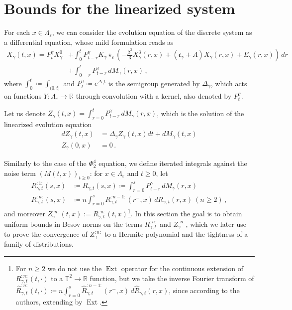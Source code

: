 \documentclass{report}
\newcommand{\RR}{\mathbb{R}}
\newcommand{\TT}{\mathbb{T}}
\newcommand{\Convolve}[3][]{#2 \star_{#1} #3}
\DeclareMathOperator{\DefiningEquality}{\coloneqq}
\DeclareMathOperator{\Ext}{Ext}
\theoremstyle{remark}
\theoremstyle{definition}
\let\epsilon\varepsilon
\begin{document}
\chapter{Bounds for the linearized system}
For each $x \in \Lambda_\epsilon$, we can consider the evolution equation of the discrete system as a differential equation, whose mild formulation reads as 
\begin{align*}
  X_\gamma(t, x) = P^\gamma_t X^0_\gamma &+ \int_{0}^{t}P^\gamma_{t-r} \Convolve[\epsilon]{K_\gamma}{\left(-\frac{\beta^3}{3}X^3_\gamma(r, x) + (\mathfrak{c}_\gamma + A) X_\gamma(r, x) + E_\gamma(r, x)\right)\,dr}\\
  &+\int_{0=r}^{t}P^\gamma_{t-r}\,dM_\gamma(r, x)\,,
\end{align*}
where $\int_0^t \DefiningEquality \int_{(0, t]}$ and $P^\gamma_t \DefiningEquality e^{\Delta_\gamma t}$ is the semigroup generated by $\Delta_\gamma$, which acts on functions $Y: \Lambda_\epsilon \to \RR$ through convolution with a kernel, also denoted by $P^\gamma_t$.

Let us denote $Z_\gamma(t, x) = \int_{r = 0}^t P^\gamma_{t-r} \,dM_\gamma(r, x)$, which is the solution of the linearized evolution equation
\begin{align*}
  dZ_\gamma(t, x) &= \Delta_\gamma Z_\gamma(t, x) dt + dM_\gamma(t, x)\\
  Z_\gamma(0, x) &= 0 \,.
\end{align*}

Similarly to the case of the $\Phi^4_2$ equation, we define iterated integrals against the noise term $(M(t, x))_{t \ge 0}$: for $x \in \Lambda_\epsilon$ and $t \ge 0$, let 
\begin{align*}
  R^{:1:}_{\gamma, t}(s, x) &\DefiningEquality R_{\gamma, t}(s, x) \DefiningEquality \int_{r = 0}^s P^\gamma_{t-r} \,dM_\gamma(r, x)\,\\
  R^{:n:}_{\gamma, t}(s, x) &\DefiningEquality n \int_{r = 0}^s R^{:n-1:}_{\gamma, t}(r^{-}, x)\,dR_{\gamma, t}(r, x)~(n\ge2)\,,
\end{align*}
and moreover $Z^{:n:}_\gamma(t, x) := R^{:n:}_{\gamma, t}(t, x)$\footnote{For $n \ge 2$  we do not use the $\Ext$ operator for the continuous extension of $R^{:n:}_{\gamma, t}(t, \cdot)$ to a $\TT^2 \to \RR$ function, but we take the inverse Fourier transform of $\hat{R}^{:n:}_{\gamma, t}(t, \cdot) \DefiningEquality n \int_{r = 0}^s \hat{R}^{:n-1:}_{\gamma, t}(r^-, x)\,d\hat{R}_{\gamma, t}(r, x)$, since according to the authors,  extending by $\Ext$.}. In this section the goal is to obtain uniform bounds in Besov norms on the terms $R^{:n:}_{\gamma, t}$ and $Z^{:n:}_\gamma$, which we later use to prove the convergence of $Z^{:n:}_\gamma$ to a Hermite polynomial and the tightness of a family of distributions.
\end{document}
